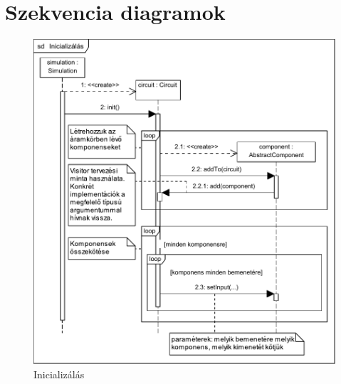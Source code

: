 \section{Szekvencia diagramok}

\begin{figure}[H]
\begin{center}
\includegraphics{chapters/chapter04/seqdiagrams/new/init.pdf}
\caption{Inicializálás}
\label{fig:init}
\end{center}
\end{figure}

